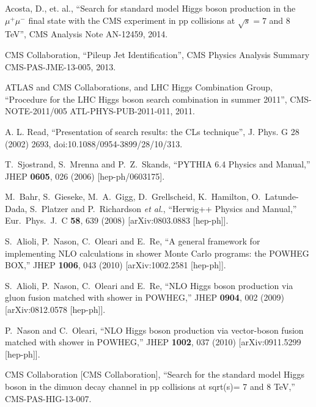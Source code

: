\documentclass[12pt]{article}
\begin{document}
\begin{thebibliography}{9}

  Acosta, D., et. al.,
  ``Search for standard model Higgs boson production in the $\mu^+\mu^-$ final state with the CMS experiment in pp collisions at $\sqrt{s}=7$ and 8\, TeV'',
  CMS Analysis Note AN-12459,
  2014.

  CMS Collaboration, ``Pileup Jet Identification'', 
  CMS Physics Analysis Summary CMS-PAS-JME-13-005, 
  2013.

  ATLAS and CMS Collaborations, and LHC Higgs Combination Group, ``Procedure for
  the LHC Higgs boson search combination in summer 2011'', 
  CMS-NOTE-2011/005 ATL-PHYS-PUB-2011-011, 2011.

  A. L. Read, ``Presentation of search results: the CLs technique'', J. Phys. G 28 (2002) 2693,
  doi:10.1088/0954-3899/28/10/313.

  T.~Sjostrand, S.~Mrenna and P.~Z.~Skands,
  ``PYTHIA 6.4 Physics and Manual,''
  JHEP {\bf 0605}, 026 (2006)
  [hep-ph/0603175].

  M.~Bahr, S.~Gieseke, M.~A.~Gigg, D.~Grellscheid, K.~Hamilton, O.~Latunde-Dada, S.~Platzer and P.~Richardson {\it et al.},
  ``Herwig++ Physics and Manual,''
  Eur.\ Phys.\ J.\ C {\bf 58}, 639 (2008)
  [arXiv:0803.0883 [hep-ph]].

  S.~Alioli, P.~Nason, C.~Oleari and E.~Re,
  ``A general framework for implementing NLO calculations in shower Monte Carlo programs: the POWHEG BOX,''
  JHEP {\bf 1006}, 043 (2010)
  [arXiv:1002.2581 [hep-ph]].

  S.~Alioli, P.~Nason, C.~Oleari and E.~Re,
  ``NLO Higgs boson production via gluon fusion matched with shower in POWHEG,''
  JHEP {\bf 0904}, 002 (2009)
  [arXiv:0812.0578 [hep-ph]].

  P.~Nason and C.~Oleari,
  ``NLO Higgs boson production via vector-boson fusion matched with shower in POWHEG,''
  JHEP {\bf 1002}, 037 (2010)
  [arXiv:0911.5299 [hep-ph]].

  CMS Collaboration [CMS Collaboration],
  ``Search for the standard model Higgs boson in the dimuon decay channel in pp collisions at sqrt(s)= 7 and 8 TeV,''
  CMS-PAS-HIG-13-007.

\end{thebibliography}
\end{document}
